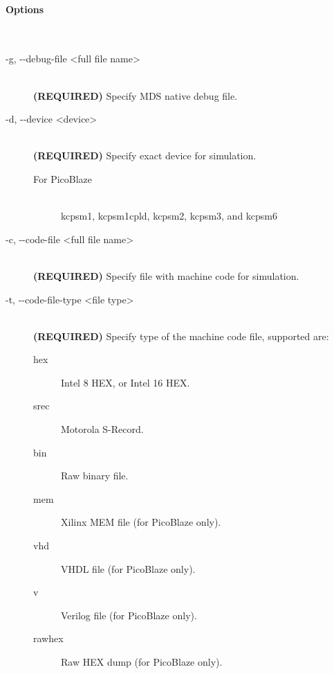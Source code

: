         \paragraph{Options}~\\
            \begin{description}
                \item[-g, -{}-debug-file <full file name>]~\\
                    \textbf{(REQUIRED)} Specify MDS native debug file.

                \item[-d, -{}-device <device>]~\\
                    \textbf{(REQUIRED)} Specify exact device for simulation.
                    \begin{description}
                        \item[For PicoBlaze]~\\
                            kcpsm1, kcpsm1cpld, kcpsm2, kcpsm3, and kcpsm6
                    \end{description}

                \item[-c, -{}-code-file <full file name>]~\\
                    \textbf{(REQUIRED)} Specify file with machine code for simulation.

                \item[-t, -{}-code-file-type <file type>]~\\
                    \textbf{(REQUIRED)} Specify type of the machine code file, supported are:
                    \begin{description}
                        \item [hex] Intel 8 HEX, or Intel 16 HEX.
                        \item [srec] Motorola S-Record.
                        \item [bin] Raw binary file.
                        \item [mem] Xilinx MEM file (for PicoBlaze only).
                        \item [vhd] VHDL file (for PicoBlaze only).
                        \item [v] Verilog file (for PicoBlaze only).
                        \item [rawhex] Raw HEX dump (for PicoBlaze only).
                    \end{description}


\end{description}
